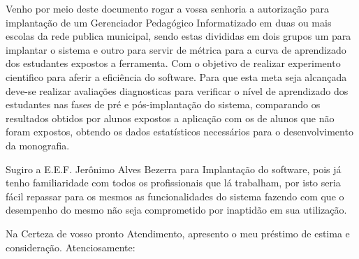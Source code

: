 \documentclass[12pt]{article}
\begin{document}
Venho por meio deste documento rogar a vossa senhoria a autorização para implantação de um Gerenciador Pedagógico Informatizado  em duas ou mais escolas da rede publica municipal, sendo estas divididas em dois grupos  um para implantar o sistema  e outro para servir de métrica para a curva de aprendizado dos estudantes expostos a ferramenta.  Com o objetivo de realizar experimento cientifico para aferir a eficiência do software.  Para que esta meta seja alcançada deve-se realizar avaliações diagnosticas para verificar o nível de aprendizado  dos estudantes nas fases de pré e pós-implantação do sistema, comparando os resultados obtidos por alunos expostos a aplicação com os de alunos que não foram expostos, obtendo os dados estatísticos necessários para o desenvolvimento da monografia. 

Sugiro a E.E.F. Jerônimo Alves Bezerra para Implantação do software, pois já tenho  familiaridade com todos os profissionais que lá trabalham, por isto seria fácil repassar para os mesmos as funcionalidades do sistema fazendo com que o desempenho do mesmo não seja comprometido por inaptidão em sua utilização. 

Na Certeza de vosso pronto Atendimento, apresento o meu préstimo de estima e consideração. Atenciosamente:
\end{document}
